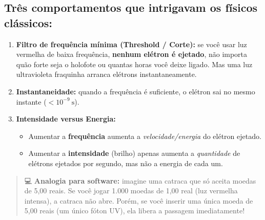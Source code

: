 \documentclass[
  brazilian,
]{report}
\providecommand{\tightlist}{%
  \setlength{\itemsep}{0pt}\setlength{\parskip}{0pt}}
\begin{document}
\subsection{Três comportamentos que intrigavam os físicos
clássicos:}\label{truxeas-comportamentos-que-intrigavam-os-fuxedsicos-cluxe1ssicos}

\begin{enumerate}
\def\labelenumi{\arabic{enumi}.}
\tightlist
\item
  \textbf{Filtro de frequência mínima (Threshold / Corte):} se você usar
  luz vermelha de baixa frequência, \textbf{nenhum elétron é ejetado},
  não importa quão forte seja o holofote ou quantas horas você deixe
  ligado. Mas uma luz ultravioleta fraquinha arranca elétrons
  instantaneamente.
\item
  \textbf{Instantaneidade:} quando a frequência é suficiente, o elétron
  sai no mesmo instante (\(< 10^{-9}\ \text{s}\)).
\item
  \textbf{Intensidade versus Energia:}

  \begin{itemize}
  \tightlist
  \item
    Aumentar a \textbf{frequência} aumenta a \emph{velocidade/energia}
    do elétron ejetado.
  \item
    Aumentar a \textbf{intensidade} (brilho) apenas aumenta a
    \emph{quantidade} de elétrons ejetados por segundo, mas não a
    energia de cada um.
  \end{itemize}
\end{enumerate}

\begin{quote}
💻 \textbf{Analogia para software:} imagine uma catraca que só aceita
moedas de 5,00 reais. Se você jogar 1.000 moedas de 1,00 real (luz
vermelha intensa), a catraca não abre. Porém, se você inserir uma única
moeda de 5,00 reais (um único fóton UV), ela libera a passagem
imediatamente!
\end{quote}
\end{document}

